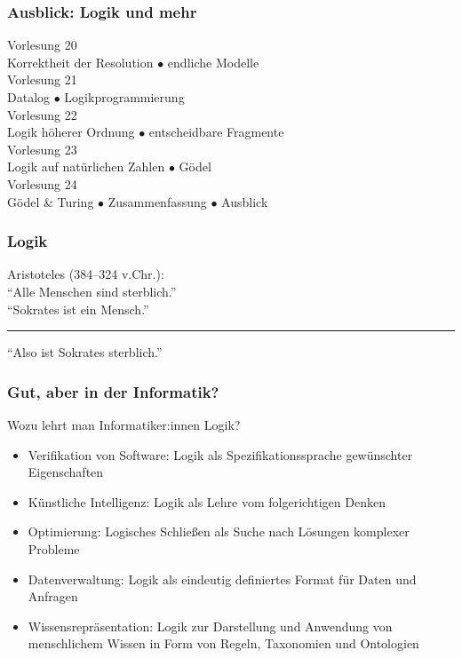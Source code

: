 \documentclass[aspectratio=1610,onlymath]{beamer}
\begin{document}
\begin{frame}\frametitle{Ausblick: Logik und mehr}

\begin{center}
\alert{Vorlesung 20}\\
Korrektheit der Resolution $\bullet$ endliche Modelle\\[1ex]
\alert{Vorlesung 21}\\
Datalog $\bullet$ Logikprogrammierung \\[1ex]
\alert{Vorlesung 22}\\
Logik höherer Ordnung $\bullet$ entscheidbare Fragmente\\[1ex]
\alert{Vorlesung 23}\\
Logik auf natürlichen Zahlen $\bullet$ Gödel\\[1ex]
\alert{Vorlesung 24}\\
Gödel \& Turing $\bullet$ Zusammenfassung $\bullet$ Ausblick
\end{center}

\end{frame}


\begin{frame}\frametitle{Logik}

\begin{center}
Aristoteles (384--324 v.Chr.):\\[1cm]

"`Alle Menschen sind sterblich."'\\
"`Sokrates ist ein Mensch."'\\
\rule{7cm}{1pt}

"`Also ist Sokrates sterblich."'

\end{center}

\end{frame}

\begin{frame}\frametitle{Gut, aber in der Informatik?}

Wozu lehrt man Informatiker:innen Logik?
\begin{itemize}
\item \alert{Verifikation von Software:} Logik als Spezifikationssprache gewünschter Eigenschaften
\item \alert{Künstliche Intelligenz:} Logik als Lehre vom folgerichtigen Denken
\item \alert{Optimierung:} Logisches Schließen als Suche nach Lösungen komplexer Probleme
\item \alert{Datenverwaltung:} Logik als eindeutig definiertes Format für Daten und Anfragen
\item \alert{Wissensrepräsentation:} Logik zur Darstellung und Anwendung von menschlichem Wissen in Form von Regeln, Taxonomien und Ontologien
\end{itemize}

\end{frame}
\end{document}
